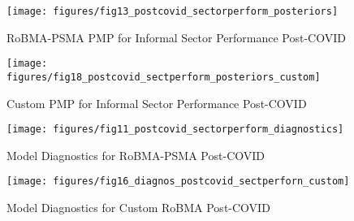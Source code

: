 \documentclass[12pt, article]{article}
\begin{document}
    \begin{figure}[H]
        \centering
        \texttt{[image: figures/fig13\_postcovid\_sectorperform\_posteriors]}
        \caption{RoBMA-PSMA PMP for Informal Sector Performance Post-COVID}
        \label{fig10:robma-psma-pmp-postcovid-sectorperform-posteriors}
    \end{figure}

    \begin{figure}[H]
        \centering
        \texttt{[image: figures/fig18\_postcovid\_sectperform\_posteriors\_custom]}
        \caption{Custom PMP for Informal Sector Performance Post-COVID}
        \label{fig11:custom-pmp-postcovid-sectorperform-posteriors}
    \end{figure}

    \begin{figure}[H]
        \centering
        \texttt{[image: figures/fig11\_postcovid\_sectorperform\_diagnostics]}
        \caption{Model Diagnostics for RoBMA-PSMA Post-COVID}
        \label{fig8:diagnostics-robma-psma-postcovid-sectorperform}
    \end{figure}

    \begin{figure}[H]
        \centering
        \texttt{[image: figures/fig16\_diagnos\_postcovid\_sectperforn\_custom]}
        \caption{Model Diagnostics for Custom RoBMA Post-COVID}
        \label{fig8:diagnostics-custom-postcovid-sectorperform}
    \end{figure}


    \newpage
    \printbibliography
\end{document}
